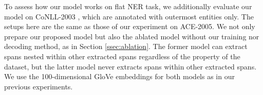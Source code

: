 \documentclass[11pt,a4paper]{article}
\begin{document}
\begin{table}[t!]
\centering
\small
{}
\caption{Comparison on CoNLL-2003. We group methods into two types. The first group consists of the methods that do not use any contextual word embeddings. The second one consists of the methods that use contextual word embeddings such as BERT and FLAIR. ``'' indicates the methods using POS tags. ``'' indicates the methods not designed to extract nested entities.}\label{tab:main-results-conll-2003}
\end{table}

To assess how our model works on flat NER task, we additionally evaluate our model on CoNLL-2003 \cite{tjong-kim-sang-de-meulder-2003-introduction}, which are annotated with outermost entities only.
The setups here are the same as those of our experiment on ACE-2005.
We not only prepare our proposed model but also the ablated model without our training nor decoding method, as in Section \ref{ssec:ablation}.
The former model can extract spans nested within other extracted spans regardless of the property of the dataset, but the latter model never extracts spans within other extracted spans.
We use the 100-dimensional GloVe embeddings for both models as in our previous experiments.
\end{document}
